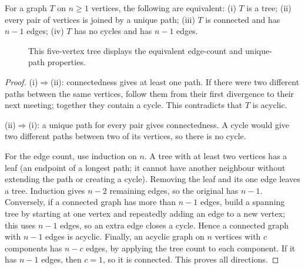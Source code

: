 \begin{theorem}
For a graph $T$ on $n\geq 1$ vertices, the following are equivalent: (i) $T$ is a tree; (ii) every pair of vertices is joined by a unique path; (iii) $T$ is connected and has $n-1$ edges; (iv) $T$ has no cycles and has $n-1$ edges.
\end{theorem}
\begin{figure}[htbp]
\centering
{}
\caption{This five-vertex tree displays the equivalent edge-count and unique-path properties.}
\end{figure}
\begin{proof}
(i)$\Rightarrow$(ii): connectedness gives at least one path. If there were two different paths between the same vertices, follow them from their first divergence to their next meeting; together they contain a cycle. This contradicts that $T$ is acyclic.

(ii)$\Rightarrow$(i): a unique path for every pair gives connectedness. A cycle would give two different paths between two of its vertices, so there is no cycle.

For the edge count, use induction on $n$. A tree with at least two vertices has a leaf (an endpoint of a longest path; it cannot have another neighbour without extending the path or creating a cycle). Removing the leaf and its one edge leaves a tree. Induction gives $n-2$ remaining edges, so the original has $n-1$. Conversely, if a connected graph has more than $n-1$ edges, build a spanning tree by starting at one vertex and repeatedly adding an edge to a new vertex; this uses $n-1$ edges, so an extra edge closes a cycle. Hence a connected graph with $n-1$ edges is acyclic. Finally, an acyclic graph on $n$ vertices with $c$ components has $n-c$ edges, by applying the tree count to each component. If it has $n-1$ edges, then $c=1$, so it is connected. This proves all directions.
\end{proof}


